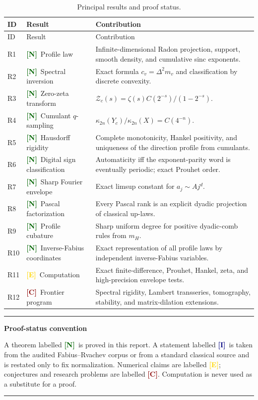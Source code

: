 \documentclass[11pt]{article}
\numberwithin{equation}{section}
\theoremstyle{definition}
\theoremstyle{remark}
\newcommand{\New}{\textcolor{darkgreen}{\textsf{\textbf{[N]}}}}
\newcommand{\Imported}{\textcolor{navy}{\textsf{\textbf{[I]}}}}
\newcommand{\Evidence}{\textcolor{gold}{\textsf{\textbf{[E]}}}}
\newcommand{\Conj}{\textcolor{darkred}{\textsf{\textbf{[C]}}}}
\newenvironment{resultbox}[1]{%
  \begin{center}\begin{minipage}{0.94\textwidth}
  \color{navy}\hrule\vspace{0.55em}
  \textbf{#1}\par\smallskip\color{black}
}{%
  \vspace{0.55em}\color{navy}\hrule
  \end{minipage}\end{center}
}
\begin{document}
\begin{longtable}{@{}p{}p{}>{\raggedright\arraybackslash}p{}@{}}
\caption{Principal results and proof status.}\label{tab:result-ledger}\\
\toprule
ID & Result & Contribution \\
\midrule
\endfirsthead
\toprule ID & Result & Contribution \\
\midrule
\endhead
R1 & \New\ Profile law & Infinite-dimensional Radon projection, support, smooth density, and cumulative sinc exponents.\\
R2 & \New\ Spectral inversion & Exact formula $c_v=\Delta^2m_v$ and classification by discrete convexity.\\
R3 & \New\ Zero-zeta transform & $\mathcal Z_c(s)=\zeta(s)C(2^{-s})/(1-2^{-s})$.\\
R4 & \New\ Cumulant $q$-sampling & $\kappa_{2n}(Y_c)/\kappa_{2n}(X)=C(4^{-n})$.\\
R5 & \New\ Hausdorff rigidity & Complete monotonicity, Hankel positivity, and uniqueness of the direction profile from cumulants.\\
R6 & \New\ Digital sign classification & Automaticity iff the exponent-parity word is eventually periodic; exact Prouhet order.\\
R7 & \New\ Sharp Fourier envelope & Exact limsup constant for $a_j\sim Aj^d$.\\
R8 & \New\ Pascal factorization & Every Pascal rank is an explicit dyadic projection of classical up-laws.\\
R9 & \New\ Profile cubature & Sharp uniform degree for positive dyadic-comb rules from $m_H$.\\
R10 & \New\ Inverse-Fabius coordinates & Exact representation of all profile laws by independent inverse-Fabius variables.\\
R11 & \Evidence\ Computation & Exact finite-difference, Prouhet, Hankel, zeta, and high-precision envelope tests.\\
R12 & \Conj\ Frontier program & Spectral rigidity, Lambert transseries, tomography, stability, and matrix-dilation extensions.\\
\bottomrule
\end{longtable}

\begin{resultbox}{Proof-status convention}
A theorem labelled \New\ is proved in this report.  A statement labelled
\Imported\ is taken from the audited Fabius--Rvachev corpus or from a standard
classical source and is restated only to fix normalization.  Numerical claims
are labelled \Evidence; conjectures and research problems are labelled
\Conj.  Computation is never used as a substitute for a proof.
\end{resultbox}
\end{document}
